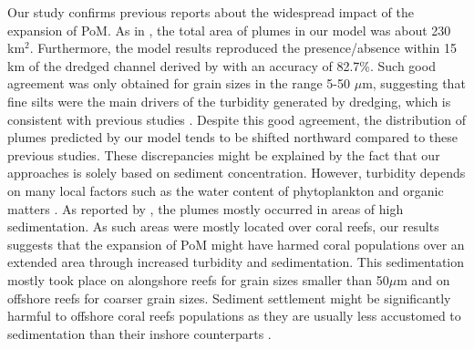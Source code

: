 Our study confirms previous reports about the widespread impact of the expansion of PoM. As in \cite{barnes2015sediment}, the total area of plumes in our model was about 230 km$^2$. Furthermore, the model results reproduced the presence/absence within 15 km of the dredged channel derived by \cite{cunning2019extensive} with an accuracy of 82.7\%. Such good agreement was only obtained for grain sizes in the range 5-50 $\mu$m, suggesting that fine silts were the main drivers of the turbidity generated by dredging, which is consistent with previous studies \citep{fourney2017additive}. Despite this good agreement, the distribution of plumes predicted by our model tends to be shifted northward compared to these previous studies. These discrepancies might be explained by the fact that our approaches is solely based on sediment concentration. However, turbidity depends on many local factors such as the water content of phytoplankton and organic matters \citep{gray2000comparability,thackston2000improved}. As reported by \cite{cunning2019extensive}, the plumes mostly occurred in areas of high sedimentation. As such areas were mostly located over coral reefs, our results suggests that the expansion of PoM might have harmed coral populations over an extended area through increased turbidity and sedimentation. This sedimentation mostly took place on alongshore reefs for grain sizes smaller than 50$\mu$m and on offshore reefs for coarser grain sizes. Sediment settlement might be significantly harmful to offshore coral reefs populations as they are usually less accustomed to sedimentation than their inshore  counterparts \citep{wolanski2005fine}.

